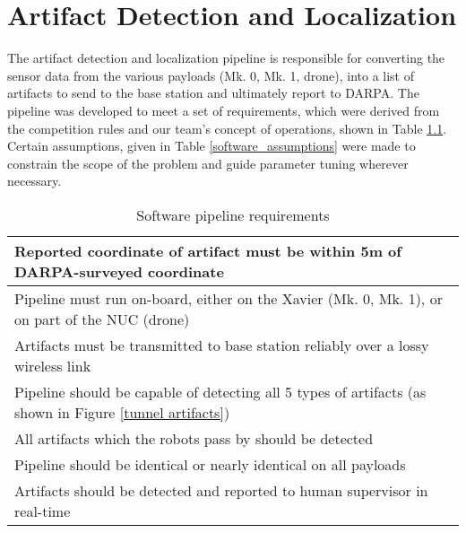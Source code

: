 \chapter{Artifact Detection and Localization}

The artifact detection and localization pipeline is responsible for converting the sensor data from the various payloads (Mk. 0, Mk. 1, drone), into a list of artifacts to send to the base station and ultimately report to DARPA. The pipeline was developed to meet a set of requirements, which were derived from the competition rules and our team's concept of operations, shown in Table \ref{software_requirements}. Certain assumptions, given in Table \ref{software_assumptions} were made to constrain the scope of the problem and guide parameter tuning wherever necessary.

\begin{table}
	\centering
		\begin{adjustbox}{max width=.95\textwidth}
	\begin{tabular}{ |l| } 
	\hline
	Reported coordinate of artifact must be within 5m of DARPA-surveyed coordinate \\ \hline
	Pipeline must run on-board, either on the Xavier (Mk. 0, Mk. 1), or on part of the NUC (drone) \\ \hline
	Artifacts must be transmitted to base station reliably over a lossy wireless link \\  \hline
	Pipeline should be capable of detecting all 5 types of artifacts (as shown in Figure \ref{tunnel artifacts}) \\ \hline
	All artifacts which the robots pass by should be detected \\ \hline
	Pipeline should be identical or nearly identical on all payloads \\ \hline
	Artifacts should be detected and reported to human supervisor in real-time \\ \hline
\end{tabular}
\end{adjustbox}
\caption{Software pipeline requirements}
\label{software_requirements}
\end{table}

